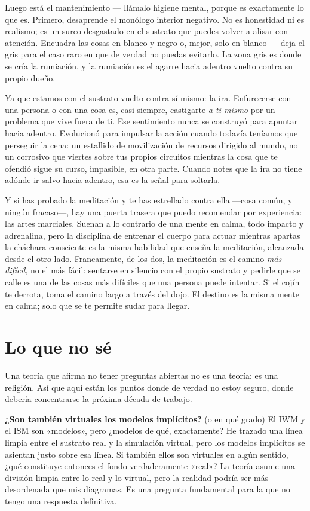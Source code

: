\documentclass[11pt, twoside, openright]{book}
\begin{document}
Luego está el mantenimiento --- llámalo higiene mental, porque es exactamente lo que es. Primero, desaprende el monólogo interior negativo. No es honestidad ni es realismo; es un surco desgastado en el sustrato que puedes volver a alisar con atención. Encuadra las cosas en blanco y negro o, mejor, solo en blanco --- deja el gris para el caso raro en que de verdad no puedas evitarlo. La zona gris es donde se cría la rumiación, y la rumiación es el agarre hacia adentro vuelto contra su propio dueño.

Ya que estamos con el sustrato vuelto contra sí mismo: la ira. Enfurecerse con una persona o con una cosa es, casi siempre, castigarte \textit{a ti mismo} por un problema que vive fuera de ti. Ese sentimiento nunca se construyó para apuntar hacia adentro. Evolucionó para impulsar la acción cuando todavía teníamos que perseguir la cena: un estallido de movilización de recursos dirigido al mundo, no un corrosivo que viertes sobre tus propios circuitos mientras la cosa que te ofendió sigue su curso, impasible, en otra parte. Cuando notes que la ira no tiene adónde ir salvo hacia adentro, esa es la señal para soltarla.

Y si has probado la meditación y te has estrellado contra ella ---cosa común, y ningún fracaso---, hay una puerta trasera que puedo recomendar por experiencia: las artes marciales. Suenan a lo contrario de una mente en calma, todo impacto y adrenalina, pero la disciplina de entrenar el cuerpo para actuar mientras apartas la cháchara consciente es la misma habilidad que enseña la meditación, alcanzada desde el otro lado. Francamente, de los dos, la meditación es el camino \textit{más difícil}, no el más fácil: sentarse en silencio con el propio sustrato y pedirle que se calle es una de las cosas más difíciles que una persona puede intentar. Si el cojín te derrota, toma el camino largo a través del dojo. El destino es la misma mente en calma; solo que se te permite sudar para llegar.

\section*{Lo que no sé}

Una teoría que afirma no tener preguntas abiertas no es una teoría: es una religión. Así que aquí están los puntos donde de verdad no estoy seguro, donde debería concentrarse la próxima década de trabajo.

\textbf{¿Son también virtuales los modelos implícitos?} (o en qué grado) El IWM y el ISM son «modelos», pero ¿modelos de qué, exactamente? He trazado una línea limpia entre el sustrato real y la simulación virtual, pero los modelos implícitos se asientan justo sobre esa línea. Si también ellos son virtuales en algún sentido, ¿qué constituye entonces el fondo verdaderamente «real»? La teoría asume una división limpia entre lo real y lo virtual, pero la realidad podría ser más desordenada que mis diagramas. Es una pregunta fundamental para la que no tengo una respuesta definitiva.
\end{document}
